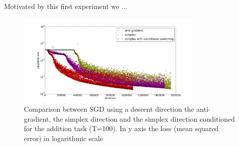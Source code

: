 Motivated by this first experiment we ...

\begin{figure}
	\centering
	\includegraphics[width= 0.8\textwidth]{chapter4/compare_add_simplex.png}
	\caption{Comparison between SGD using a descent direction the anti-gradient, the simplex direction and the simplex direction conditioned for the addition task (T=100). In y axis the loss (mean squared error) in logarithmic scale}
	\label{fig:comparisong_add_simplex}
\end{figure}
